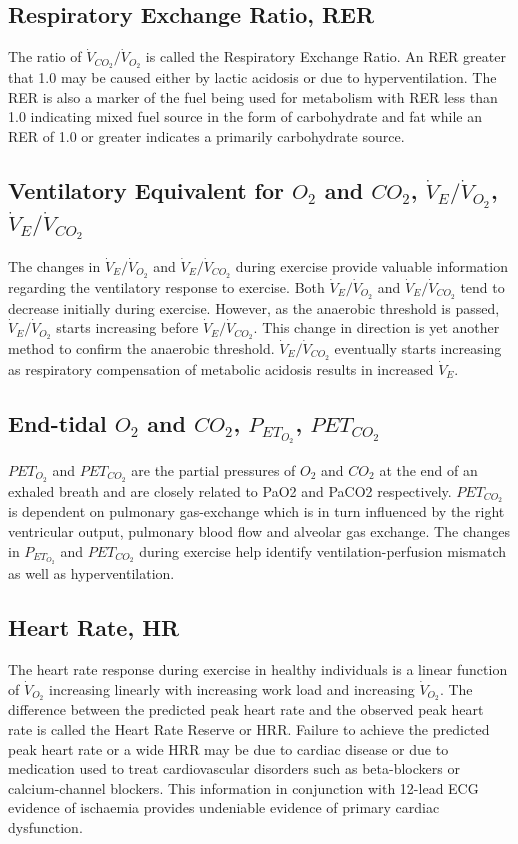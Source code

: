 \subsection{Respiratory Exchange Ratio, RER}
The ratio of $\dot{V}_{CO_2}/\dot{V}_{O_2}$ is called the Respiratory Exchange Ratio. An RER greater that 1.0 may be caused either by lactic acidosis or due to hyperventilation. The RER is also a marker of the fuel being used for metabolism with RER less than 1.0 indicating mixed fuel source in the form of carbohydrate and fat while an RER of 1.0 or greater indicates a primarily carbohydrate source.

\subsection{Ventilatory Equivalent for $O_2$ and $CO_2$, $\dot{V}_E/\dot{V}_{O_2}$, $\dot{V}_E/\dot{V}_{CO_2}$}
The changes in $\dot{V}_E/\dot{V}_{O_2}$ and $\dot{V}_E/\dot{V}_{CO_2}$ during exercise provide valuable information regarding the ventilatory response to exercise. Both $\dot{V}_E/\dot{V}_{O_2}$ and $\dot{V}_E/\dot{V}_{CO_2}$ tend to decrease initially during exercise. However, as the anaerobic threshold is passed, $\dot{V}_E/\dot{V}_{O_2}$ starts increasing before $\dot{V}_E/\dot{V}_{CO_2}$. This change in direction is yet another method to confirm the anaerobic threshold.  $\dot{V}_E/\dot{V}_{CO_2}$ eventually starts increasing as respiratory compensation of metabolic acidosis results in increased $\dot{V}_E$.

\subsection{End-tidal $O_2$ and $CO_2$, $P_{ET_{O_2}}$, $P{ET_{CO_2}}$}
$PET_{O_2}$ and $PET_{CO_2}$ are the partial pressures of $O_2$ and $CO_2$ at the end of an exhaled breath and are closely related to PaO2 and PaCO2 respectively. $P{ET_{CO_2}}$ is dependent on pulmonary gas-exchange which is in turn influenced by the right ventricular output, pulmonary blood flow and alveolar gas exchange. The changes in $P_{ET_{O_2}}$ and $P{ET_{CO_2}}$ during exercise help identify ventilation-perfusion mismatch as well as hyperventilation.

\subsection{Heart Rate, HR}
\label{sec:heart_rate}
The heart rate response during exercise in healthy individuals is a linear function of $\dot{V}_{O_2}$ increasing linearly with increasing work load and increasing $\dot{V}_{O_2}$. The difference between the predicted peak heart rate and the observed peak heart rate is called the Heart Rate Reserve or HRR. Failure to achieve the predicted peak heart rate or a wide HRR may be due to cardiac disease or due to medication used to treat cardiovascular disorders such as beta-blockers or calcium-channel blockers. This information in conjunction with 12-lead ECG evidence of ischaemia provides undeniable evidence of primary cardiac dysfunction.


